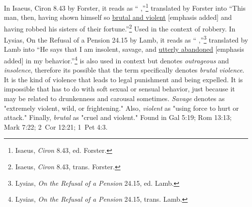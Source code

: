 In Isaeus, Ciron 8.43 by Forster, it reads as `` \underline{} ,''\footnote{Isaeus, \emph{Ciron} 8.43, ed. Forster.} 
translated by Forster into ``This man, then, having shown himself so \underline{brutal and violent} [emphasis added] and having robbed his sisters of their fortune.''\footnote{Isaeus, \emph{Ciron} 8.43, trans. Forster.} Used in the context of robbery. 
In Lysias, On the Refusal of a Pension 24.15 by Lamb, it reads as `` \underline{} ,''\footnote{Lysias, \emph{On the Refusal of a Pension} 24.15, ed. Lamb.}
translated by Lamb into ``He says that I am insolent, savage, and \underline{utterly abandoned} [emphasis added] in my behavior.''\footnote{Lysias, \emph{On the Refusal of a Pension} 24.15, trans. Lamb.}  
 is also used in context but denotes \emph{outrageous} and \emph{insolence}, therefore its possible that the term specifically denotes \emph{brutal violence}. It is the kind of violence that leads to legal punishment and being expelled. It is impossible that  has to do with soft sexual or sensual behavior, just because it may be related to drunkenness and carousal sometimes. \emph{Savage} denotes as "extremely violent, wild, or frightening." Also, \emph{violent} as "using force to hurt or attack." Finally, \emph{brutal} as "cruel and violent."
Found in Gal 5:19; Rom 13:13; Mark 7:22; 2~Cor 12:21; 1~Pet 4:3.
